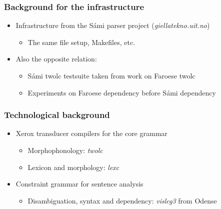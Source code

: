 \documentclass{beamer}
\begin{document}
\begin{frame}
\frametitle{Background for the infrastructure}
\begin{itemize}
\item Infrastructure from the Sámi parser project (\textit{giellatekno.uit.no})
\begin{itemize}
\item The same file setup, Makefiles, etc. \\ \pause
\end{itemize}
\item Also the opposite relation:
\begin{itemize}
\item Sámi twolc testsuite taken from work on Faroese twolc
\item Experiments on Faroese dependency before Sámi dependency
\end{itemize}
\end{itemize}
\end{frame}


\begin{frame}
\frametitle{Technological background}
\begin{itemize}
\item Xerox transducer compilers for the core grammar
\begin{itemize}
\item Morphophonology: \textit{twolc} 
\item Lexicon and morphology: \textit{lexc} \\ \pause
\end{itemize}
\item Constraint grammar for sentence analysis
\begin{itemize}
\item Disambiguation, syntax and dependency: \textit{vislcg3} from Odense
\end{itemize}
\end{itemize}
\end{frame}



\end{document}
